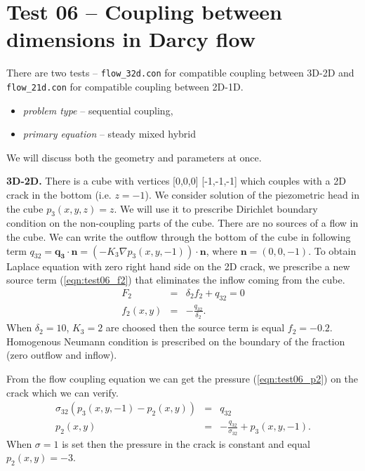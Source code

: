
\section{Test 06 -- Coupling between dimensions in Darcy flow}
\label{sec:test06}
There are two tests -- \verb'flow_32d.con' for compatible coupling between 3D-2D and \verb'flow_21d.con' for compatible coupling between 2D-1D.

\begin{itemize} 
    \item \emph{problem type} -- sequential coupling, 
    \item \emph{primary equation} -- steady mixed hybrid
  \end{itemize}

We will discuss both the geometry and parameters at once.

\textbf{3D-2D.}
There is a cube with vertices [0,0,0] [-1,-1,-1] which couples with a 2D crack in the bottom (i.e. $z=-1$).
We consider solution of the piezometric head in the cube $p_3(x,y,z) = z$. We will use it to prescribe Dirichlet boundary condition on the non-coupling parts of the cube.
There are no sources of a flow in the cube. 
We can write the outflow through the bottom of the cube in following term $q_{32} = \mathbf{q_3} \cdot \mathbf{n} = (- K_3 \nabla p_3(x,y,-1))\cdot \mathbf{n}$,
where $\mathbf{n}=(0,0,-1)$.
To obtain Laplace equation with zero right hand side on the 2D crack, we prescribe a new source term (\ref{eqn:test06_f2}) that eliminates the inflow coming from the cube.         
\begin{eqnarray}
    F_2 &=& \delta_2  f_2 + q_{32} = 0   \nonumber\\
    f_2(x,y) &=& -\frac{q_{32}}{\delta_2}   \label{eqn:test06_f2}.
\end{eqnarray}
When $\delta_2 = 10$, $K_3 = 2$ are choosed then the source term is equal $f_2 = -0.2$.
Homogenous Neumann condition is prescribed on the boundary of the fraction (zero outflow and inflow).

From the flow coupling equation we can get the pressure (\ref{eqn:test06_p2}) on the crack which we can verify.
\begin{eqnarray} 
     \sigma_{32}  ( p_3(x,y,-1) - p_2(x,y) ) &=& q_{32} \nonumber\\
     p_2(x,y) &=& -\frac{q_{32}}{\sigma_{32}} + p_3(x,y,-1) \label{eqn:test06_p2}.
\end{eqnarray}   
When $\sigma = 1$ is set then the pressure in the crack is constant and equal $p_2(x,y) = -3$.



